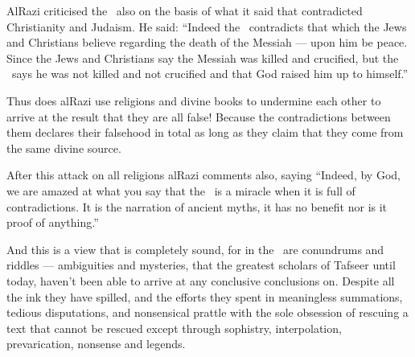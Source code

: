 \documentclass[12pt]{memoir}
\begin{document}

Al\–Razi criticised the \Quran\ also on the basis of what it said that
contradicted Christianity and Judaism.
He said: “Indeed the \Quran\ contradicts that which the Jews and Christians
believe regarding the death of the Messiah — upon him be peace.
Since the Jews and Christians say the Messiah was killed and crucified,
but the \Quran\ says he was not killed and not crucified and that God
raised him up to himself.”\fnmark


Thus does al\–Razi use religions and divine books to undermine each other
to arrive at the result that they are all false!
Because the contradictions between them declares their falsehood in total
as long as they claim that they come from the same divine source.

After this attack on all religions al\–Razi comments also, saying
“Indeed, by God, we are amazed at what you say that the \Quran\ is a miracle
when it is full of contradictions.
It is the narration of ancient myths,
it has no benefit nor is it proof of anything.”\fnmark


And this is a view that is completely sound,
for in the \Quran\ are conundrums and riddles — ambiguities and mysteries,
that the greatest scholars of Tafseer until today,
haven’t been able to arrive at any conclusive conclusions on.
Despite all the ink they have spilled,
and the efforts they spent in meaningless summations, tedious disputations,
and nonsensical prattle with the sole obsession of rescuing a text
that cannot be rescued except through sophistry, interpolation,
prevarication, nonsense and legends.\fnmark

\end{document}
